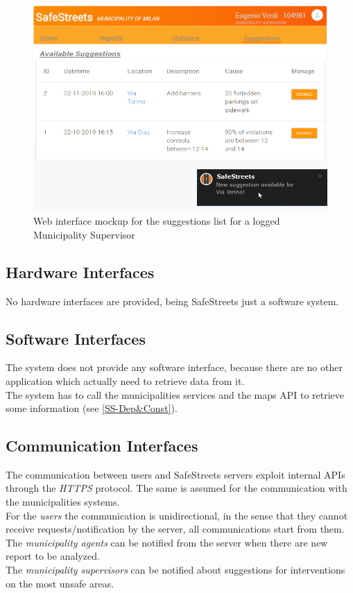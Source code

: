 \documentclass[a4paper]{report}
\begin{document}
\begin{figure}[htp]
\centering
\includegraphics[width= \textwidth]{mockups/homeSuggestions.png}
\caption[Web mockup for suggestions page]{Web interface mockup for the suggestions list for a logged Municipality Supervisor}
\label{fig:mock-suggestions}
\end{figure}
\subsection{Hardware Interfaces}
No hardware interfaces are provided, being SafeStreets just a software system.
\subsection{Software Interfaces}
The system does not provide any software interface, because there are no other application which actually need to retrieve data from it. \\
The system has to call the municipalities services and the maps API to retrieve some information (see \ref{SS-Dep&Const}).
\subsection{Communication Interfaces}
The communication between users and SafeStreets servers exploit internal APIs through the \textit{HTTPS} protocol. The same is assumed for the communication with the municipalities systems. \\
For the \textit{users} the communication is unidirectional, in the sense that they cannot receive requests/notification by the server, all communications start from them. \\
The \textit{municipality agents} can be notified from the server when there are new report to be analyzed. \\
The \textit{municipality supervisors} can be notified about suggestions for interventions on the most unsafe areas.
\end{document}

